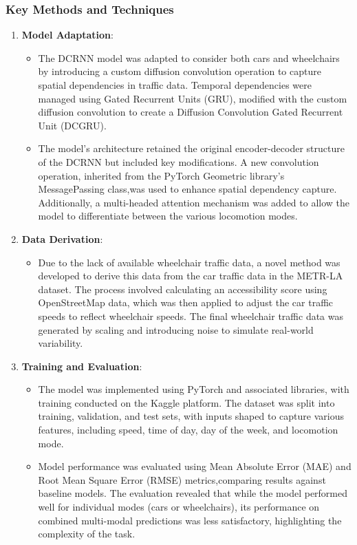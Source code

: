 \subsubsection{Key Methods and Techniques}\label{subsubsec:key-methods-and-techniques}
\begin{enumerate}
    \item \textbf{Model Adaptation}:
    \begin{itemize}
        \item
        The DCRNN model was adapted to consider both cars and wheelchairs by introducing a custom diffusion convolution
        operation to capture spatial dependencies in traffic data.
        Temporal dependencies were managed using Gated Recurrent Units (GRU), modified with the custom diffusion
        convolution to create a Diffusion Convolution Gated Recurrent Unit (DCGRU).
        \item
        The model's architecture retained the original encoder-decoder structure of the DCRNN but included key
        modifications.
        A new convolution operation, inherited from the PyTorch Geometric library's MessagePassing class,was used to
        enhance spatial dependency capture.
        Additionally, a multi-headed attention mechanism was added to allow the model to differentiate between the
        various locomotion modes.
    \end{itemize}

    \item \textbf{Data Derivation}:
    \begin{itemize}
        \item
        Due to the lack of available wheelchair traffic data, a novel method was developed to derive this data from the
        car traffic data in the METR-LA dataset.
        The process involved calculating an accessibility score using OpenStreetMap data, which was then applied to
        adjust the car traffic speeds to reflect wheelchair speeds.
        The final wheelchair traffic data was generated by scaling and introducing noise to simulate real-world
        variability.
    \end{itemize}

    \item \textbf{Training and Evaluation}:
    \begin{itemize}
        \item
        The model was implemented using PyTorch and associated libraries, with training conducted on the Kaggle
        platform.
        The dataset was split into training, validation, and test sets, with inputs shaped to capture various features,
        including speed, time of day, day of the week, and locomotion mode.
        \item
        Model performance was evaluated using Mean Absolute Error (MAE) and Root Mean Square Error (RMSE)
        metrics,comparing results against baseline models.
        The evaluation revealed that while the model performed well for individual modes (cars or wheelchairs), its
        performance on combined multi-modal predictions was less satisfactory, highlighting the complexity of the task.
    \end{itemize}
\end{enumerate}

